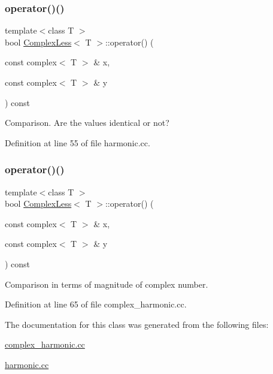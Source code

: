 \subsubsection{\texorpdfstring{operator()()}{operator()()}\hspace{0.1cm}{\footnotesize\ttfamily [1/2]}}
{\footnotesize\ttfamily template$<$class T $>$ \\
bool \hyperlink{classComplexLess}{Complex\+Less}$<$ T $>$\+::operator() (\begin{DoxyParamCaption}\item[{const complex$<$ T $>$ \&}]{x,  }\item[{const complex$<$ T $>$ \&}]{y }\end{DoxyParamCaption}) const\hspace{0.3cm}{\ttfamily [inline]}}



Comparison. Are the values identical or not? 



Definition at line 55 of file harmonic.\+cc.

\mbox{\label{classComplexLess_abb81bdb8dd1f9076863b5f3523272343}} 
\subsubsection{\texorpdfstring{operator()()}{operator()()}\hspace{0.1cm}{\footnotesize\ttfamily [2/2]}}
{\footnotesize\ttfamily template$<$class T $>$ \\
bool \hyperlink{classComplexLess}{Complex\+Less}$<$ T $>$\+::operator() (\begin{DoxyParamCaption}\item[{const complex$<$ T $>$ \&}]{x,  }\item[{const complex$<$ T $>$ \&}]{y }\end{DoxyParamCaption}) const\hspace{0.3cm}{\ttfamily [inline]}}



Comparison in terms of magnitude of complex number. 



Definition at line 65 of file complex\+\_\+harmonic.\+cc.



The documentation for this class was generated from the following files\+:\begin{DoxyCompactItemize}
\item 
\hyperlink{complex__harmonic_8cc}{complex\+\_\+harmonic.\+cc}\item 
\hyperlink{harmonic_8cc}{harmonic.\+cc}\end{DoxyCompactItemize}
